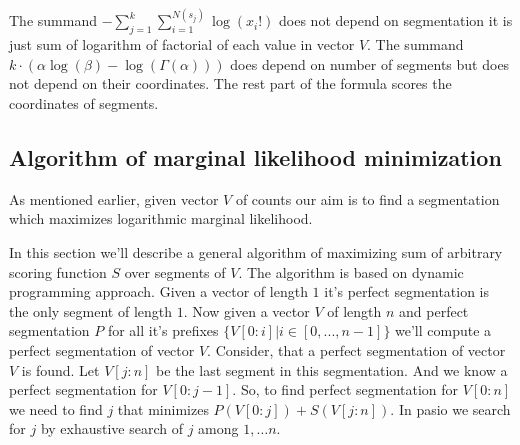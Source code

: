 \documentclass[10pt,letterpaper]{article}
\begin{document}



The summand $-\sum _{j=1} ^{k}\sum _{i=1} ^{N(s_j)} \log \left( x_i! \right)$ does not depend on segmentation
it is just sum of logarithm of factorial of each value in vector $V$.
The summand $k\cdot\left(\alpha \log \left( \beta \right) - \log \left( \Gamma(\alpha) \right)\right)$ does depend on number of segments
but does not depend on their coordinates.
The rest part of the formula scores the coordinates of segments.


\subsection{Algorithm of marginal likelihood minimization}

As mentioned earlier, given vector $V$ of counts our aim is to find a segmentation which maximizes logarithmic marginal likelihood.

In this section we'll describe a general algorithm of maximizing sum of arbitrary scoring function $S$ over segments of $V$.
The algorithm is based on dynamic programming approach.
Given a vector of length $1$ it's perfect segmentation is the only segment of length $1$.
Now given a vector $V$ of length $n$ and perfect segmentation $P$ for all it's prefixes $\{V[0:i] | i \in [0, ..., n-1]\}$ we'll compute a perfect segmentation of vector $V$. 
Consider, that a perfect segmentation of vector $V$ is found.
Let $V[j:n]$ be the last segment in this segmentation.
And we know a perfect segmentation for $V[0:j-1]$.
So, to find perfect segmentation for $V[0:n]$ we need to
find $j$ that minimizes $P(V[0:j]) + S(V[j:n])$.
In pasio we search for $j$ by exhaustive search of $j$
among $1, \dots n$.
\end{document}
